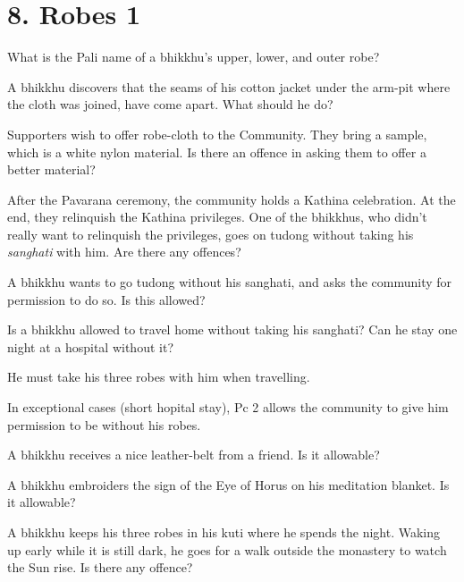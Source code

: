 \chapter{8. Robes 1}
\renewcommand*{\theChapterTitle}{8. Robes 1}

What is the Pali name of a bhikkhu's upper, lower, and outer robe?

\bigskip

A bhikkhu discovers that the seams of his cotton jacket under the arm-pit where
the cloth was joined, have come apart. What should he do?

\bigskip

Supporters wish to offer robe-cloth to the Community. They bring a sample, which
is a white nylon material. Is there an offence in asking them to offer a better
material?

\bigskip

After the Pavarana ceremony, the community holds a Kathina celebration.
At the end, they relinquish the Kathina privileges.
One of the bhikkhus, who didn't really want to relinquish the privileges,
goes on tudong without taking his \emph{sanghati} with him.
Are there any offences?

\bigskip

A bhikkhu wants to go tudong without his sanghati, and asks the community for
permission to do so. Is this allowed?

\bigskip

Is a bhikkhu allowed to travel home without taking his sanghati? Can he stay one
night at a hospital without it?

\begin{solution}
  He must take his three robes with him when travelling.

  In exceptional cases (short hopital stay), Pc 2 allows the community to give
  him permission to be without his robes.
\end{solution}

\bigskip

A bhikkhu receives a nice leather-belt from a friend. Is it allowable?

\bigskip

A bhikkhu embroiders the sign of the Eye of Horus on his meditation blanket. Is it
allowable?

\bigskip

A bhikkhu keeps his three robes in his kuti where he spends the night.
Waking up early while it is still dark, he goes for a walk outside the monastery to watch the Sun rise.
Is there any offence?

